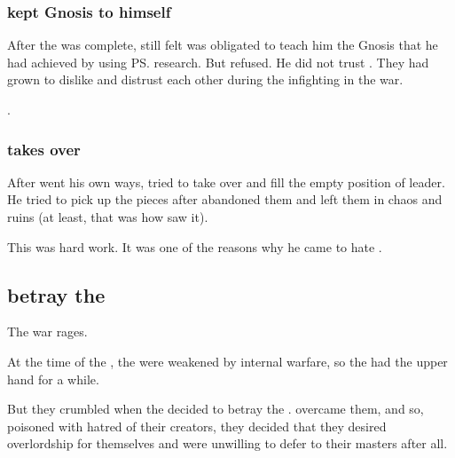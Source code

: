 \subsubsection{\Ishnaruchaefir{} kept Gnosis to himself}
After the \SecondShrouding{} was complete, \Secherdamon{} still felt \Ishnaruchaefir{} was obligated to teach him the Gnosis that he had achieved by using \ps{\Secherdamon} research. 
But \Ishnaruchaefir{} refused. 
He did not trust \Secherdamon. 
They had grown to dislike and distrust each other during the infighting in the war. 

. 





\subsubsection{\Secherdamon{} takes over}
After \Ishnaruchaefir{} went his own ways, \Secherdamon{} tried to take over and fill the empty position of leader. 
He tried to pick up the pieces after \Ishnaruchaefir{} abandoned them and left them in chaos and ruins (at least, that was how \Secherdamon{} saw it). 

This was hard work. 
It was one of the reasons why he came to hate \Ishnaruchaefir. 









\subsection{\Satharioth{} betray the \banelords}
The war rages. 

At the time of the \secondbanewar, the \dragons{} were weakened by internal warfare, so the \resphain{} had the upper hand for a while. 

But they crumbled when the \satharioth{} decided to betray the \banes.
 overcame them, and so, poisoned with hatred of their creators, they decided that they desired overlordship for themselves and were unwilling to defer to their \bane{} masters after all. 

